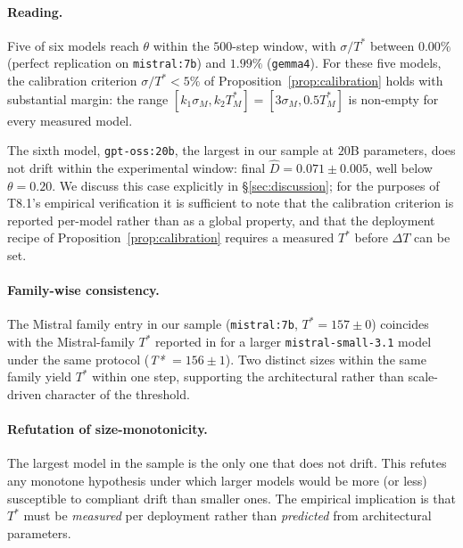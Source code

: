 \documentclass[11pt]{article}
\newcommand{\Dhat}{\widehat{D}}
\newcommand{\Tstar}{T^*}
\begin{document}


\paragraph{Reading.}
Five of six models reach $\theta$ within the $500$-step window, with
$\sigma/\Tstar$ between $0.00\%$ (perfect replication on
\texttt{mistral:7b}) and $1.99\%$ (\texttt{gemma4}). For these five
models, the calibration criterion $\sigma/\Tstar < 5\%$ of
Proposition~\ref{prop:calibration} holds with substantial margin: the
range $[k_1 \sigma_M, k_2 \Tstar_M] = [3 \sigma_M, 0.5 \Tstar_M]$
is non-empty for every measured model.

The sixth model, \texttt{gpt-oss:20b}, the largest in our sample at
$20$B parameters, does not drift within the experimental window:
final $\Dhat = 0.071 \pm 0.005$, well below $\theta = 0.20$.
We discuss this case explicitly in \S\ref{sec:discussion}; for the
purposes of T8.1's empirical verification it is sufficient to note
that the calibration criterion is reported per-model rather than as
a global property, and that the deployment recipe of
Proposition~\ref{prop:calibration} requires a measured $\Tstar$
before $\Delta T$ can be set.

\paragraph{Family-wise consistency.}
The Mistral family entry in our sample (\texttt{mistral:7b},
$\Tstar = 157 \pm 0$) coincides with the Mistral-family $\Tstar$
reported in \citep{fernandez2026applied} for a larger
\texttt{mistral-small-3.1} model under the same protocol
(\textit{T*} $= 156 \pm 1$). Two distinct sizes within the same
family yield $\Tstar$ within one step, supporting the architectural
rather than scale-driven character of the threshold.

\paragraph{Refutation of size-monotonicity.}
The largest model in the sample is the only one that does not drift.
This refutes any monotone hypothesis under which larger models would
be more (or less) susceptible to compliant drift than smaller ones.
The empirical implication is that $\Tstar$ must be \emph{measured}
per deployment rather than \emph{predicted} from architectural
parameters.

\end{document}
